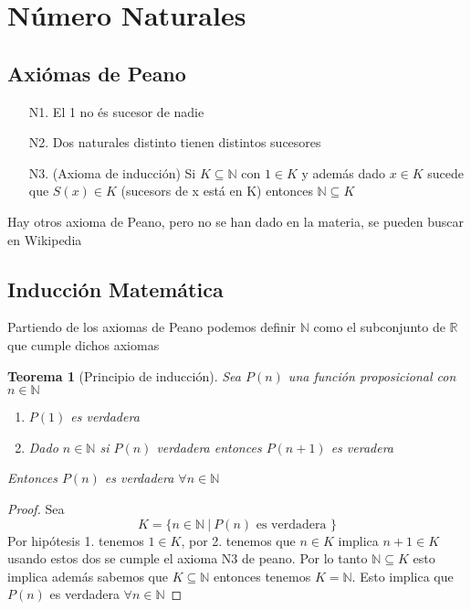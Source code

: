 \documentclass{article}
\theoremstyle{break}
\newtheorem{theorem}{Teorema}[section]
\def \R{\mathbb{R}}
\def \N{\mathbb{N}}
\begin{document}
    \newpage
    
    \section{Número Naturales}
    \subsection{Axiómas de Peano}\label{sec:Peano}
    \begin{tcolorbox}
    \begin{itemize}
        \item[N1.] El 1 no és sucesor de nadie
        \item[N2.] Dos naturales distinto tienen distintos sucesores
        \item[N3.] (Axioma de inducción) Si $K \subseteq \N$ con $1 \in K$ y además dado $x \in K$
        sucede que $S(x) \in K$ (sucesors de x está en K) entonces $\N \subseteq K$
    \end{itemize}
    \end{tcolorbox}
    Hay otros axioma de Peano, pero no se han dado en la materia, se pueden buscar en Wikipedia

    \subsection{Inducción Matemática}\label{sec:Induc}
    Partiendo de los axiomas de Peano podemos definir $\N$ como el subconjunto de $\R$
    que cumple dichos axiomas
    \begin{tcolorbox}
        \begin{theorem}[Principio de inducción]
            Sea $P(n)$ una función proposicional con $n \in \N$
            \begin{enumerate}
                \item $P(1)$ es verdadera 
                \item Dado $n\in\N$ si $P(n)$ verdadera entonces $P(n+1)$ es veradera
            \end{enumerate}
        Entonces $P(n)$ es verdadera $\forall n\in \N$
        \end{theorem}
    \end{tcolorbox}
    \begin{proof}

            Sea $$K = \{n \in \N \ | \ P(n) \text{ es verdadera } \}$$ Por hipótesis 1. tenemos $1\in K$, por 2.
            tenemos que $n \in K$ implica $n+1 \in K$ usando estos dos se cumple el axioma N3 de peano. Por lo tanto
            $\N \subseteq K$ esto implica además sabemos que $K\subseteq \N$ entonces tenemos $K=\N$.
            Esto implica que $P(n)$ es verdadera $\forall n \in \N$
    \end{proof}
    
\end{document}
